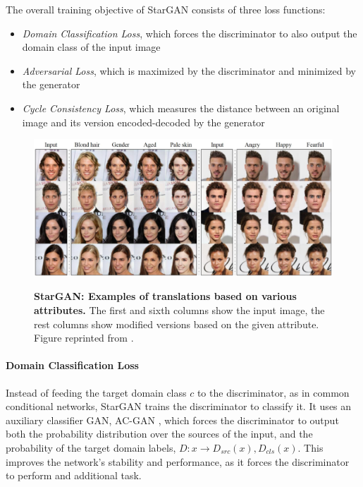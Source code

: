 \documentclass{article}
\begin{document}
The overall training objective of StarGAN consists of three loss functions:
\begin{itemize}
\item \textit{Domain Classification Loss}, which forces the discriminator to also output the domain class of the input image
\item \textit{Adversarial Loss}, which is maximized by the discriminator and minimized by the generator
\item \textit{Cycle Consistency Loss}, which measures the distance between an original image and its version encoded-decoded by the generator
\end{itemize}

\begin{figure}[h]
\centering
{\includegraphics[width=\linewidth]{GAN/stargan_example}}
\caption{\label{fig:stargan_examples} \textbf{StarGAN: Examples of translations based on various attributes.} The first and sixth columns show the input image, the rest columns show modified versions based on the given attribute. Figure reprinted from \cite{choi_stargan_2017}.}
\end{figure}

\paragraph{Domain Classification Loss} 
Instead of feeding the target domain class $c$ to the discriminator, as in common conditional networks, StarGAN trains the discriminator to classify it. It uses an auxiliary classifier GAN, AC-GAN \cite{odena_conditional_2016}, which forces the discriminator to output both the probability distribution over the sources of the input, and the probability of the target domain labels, $D: x \rightarrow {D_{src}(x), D_{cls}(x)}$. This improves the network's stability and performance, as it forces the discriminator to perform and additional task.
\end{document}
